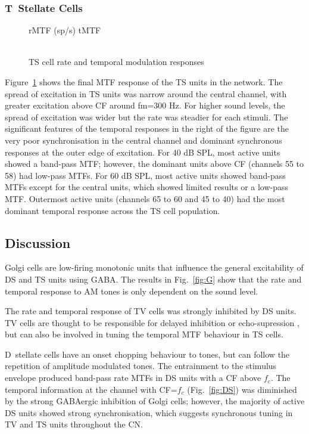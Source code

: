 \subsubsection{T~Stellate Cells}
\begin{figure}[tb]
\centering 
\caption{TS cell rate and temporal modulation responses}\label{fig:TS}
{\hspace{0.2\columnwidth}rMTF (sp/s) \hspace{0.35\columnwidth} tMTF}\\
\\
\end{figure}
Figure~\ref{fig:TS} shows the final MTF response of the TS units in
the network.  The spread of excitation in TS units was narrow
around the central channel, with greater excitation above CF around
fm=300 Hz. For higher sound levels, the spread of excitation was
wider but the rate was steadier for each stimuli.  The significant
features of the temporal responses in the right of the figure are
the very poor synchronisation in the central channel and dominant
synchronous responses at the outer edge of excitation.  For 40 dB
SPL, most active units showed a band-pass MTF; however, the
dominant units above CF (channels 55 to 58) had low-pass MTFs.  For
60 dB SPL, most active units showed band-pass MTFs except for the
central units, which showed limited results or a low-pass MTF.
Outermost active units (channels 65 to 60 and 45 to 40) had the
most dominant temporal response across the TS cell population.


\subsection{Discussion}

Golgi cells are low-firing monotonic units that influence the
general excitability of DS and TS units using GABA.  The results in
Fig.~\ref{fig:G} show that the rate and temporal response to AM
tones is only dependent on the sound level. 

The rate and temporal response of TV cells was
strongly inhibited by DS units.  TV cells are thought to be
responsible for delayed inhibition or echo-supression
\cite{WickesbergOertel:1990}, but can also be involved in tuning
the temporal MTF behaviour in TS cells.

D~stellate cells have an onset chopping behaviour to tones, but can
follow the repetition of amplitude modulated tones. The entrainment
to the stimulus envelope produced band-pass rate MTFs in DS units
with a CF above $f_c$.  The temporal information at the channel
with CF=$f_c$ (Fig.~\ref{fig:DS}) was diminished by the strong
GABAergic inhibition of Golgi cells; however, the majority of active
DS units showed strong synchronisation, which suggests 
synchronous tuning in TV and TS units throughout the CN.

